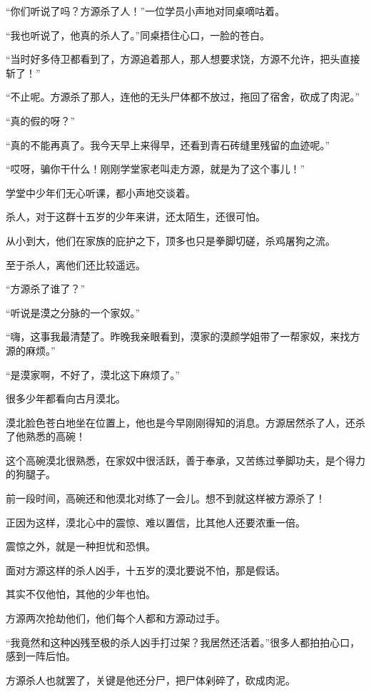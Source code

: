 
\begin{this_body}

“你们听说了吗？方源杀了人！”一位学员小声地对同桌嘀咕着。

“我也听说了，他真的杀人了。”同桌捂住心口，一脸的苍白。

“当时好多侍卫都看到了，方源追着那人，那人想要求饶，方源不允许，把头直接斩了！”

“不止呢。方源杀了那人，连他的无头尸体都不放过，拖回了宿舍，砍成了肉泥。”

“真的假的呀？”

“真的不能再真了。我今天早上来得早，还看到青石砖缝里残留的血迹呢。”

“哎呀，骗你干什么！刚刚学堂家老叫走方源，就是为了这个事儿！”

学堂中少年们无心听课，都小声地交谈着。

杀人，对于这群十五岁的少年来讲，还太陌生，还很可怕。

从小到大，他们在家族的庇护之下，顶多也只是拳脚切磋，杀鸡屠狗之流。

至于杀人，离他们还比较遥远。

“方源杀了谁了？”

“听说是漠之分脉的一个家奴。”

“嗨，这事我最清楚了。昨晚我亲眼看到，漠家的漠颜学姐带了一帮家奴，来找方源的麻烦。”

“是漠家啊，不好了，漠北这下麻烦了。”

很多少年都看向古月漠北。

漠北脸色苍白地坐在位置上，他也是今早刚刚得知的消息。方源居然杀了人，还杀了他熟悉的高碗！

这个高碗漠北很熟悉，在家奴中很活跃，善于奉承，又苦练过拳脚功夫，是个得力的狗腿子。

前一段时间，高碗还和他漠北对练了一会儿。想不到就这样被方源杀了！

正因为这样，漠北心中的震惊、难以置信，比其他人还要浓重一倍。

震惊之外，就是一种担忧和恐惧。

面对方源这样的杀人凶手，十五岁的漠北要说不怕，那是假话。

其实不仅他怕，其他的少年也怕。

方源两次抢劫他们，他们每个人都和方源动过手。

“我竟然和这种凶残至极的杀人凶手打过架？我居然还活着。”很多人都拍拍心口，感到一阵后怕。

方源杀人也就罢了，关键是他还分尸，把尸体剁碎了，砍成肉泥。


\end{this_body}
